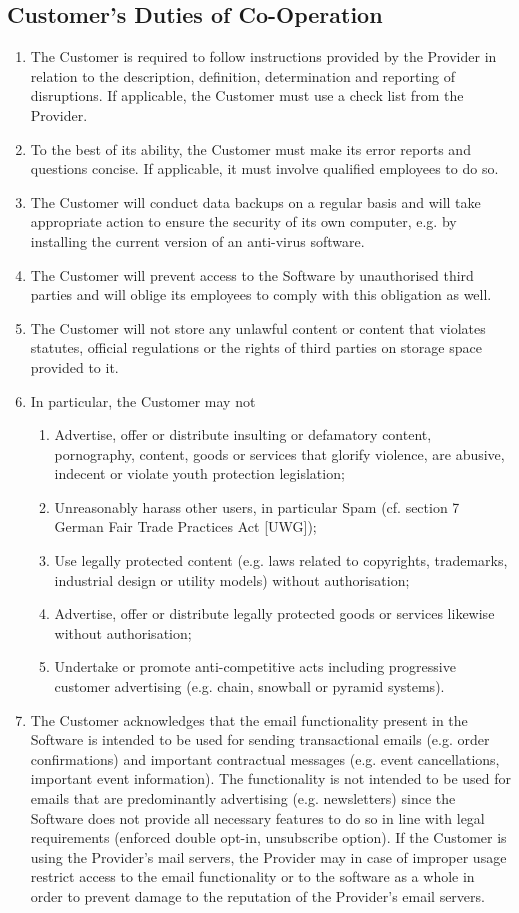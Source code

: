 \documentclass{terms}
\begin{document}
\subsection{Customer’s Duties of Co-Operation}
\begin{enumerate}
\item The Customer is required to follow instructions provided by the Provider in relation to the description, definition, determination and reporting of disruptions. If applicable, the Customer must use a check list from the Provider.
\item To the best of its ability, the Customer must make its error reports and questions concise. If applicable, it must involve qualified employees to do so.
\item The Customer will conduct data backups on a regular basis and will take appropriate action to ensure the security of its own computer, e.g. by installing the current version of an anti-virus software.
\item The Customer will prevent access to the Software by unauthorised third parties and will oblige its employees to comply with this obligation as well.
\item The Customer will not store any unlawful content or content that violates statutes, official regulations or the rights of third parties on storage space provided to it. 
\item In particular, the Customer may not \begin{enumerate}
\item Advertise, offer or distribute insulting or defamatory content, pornography, content, goods or services that glorify violence, are abusive, indecent or violate youth protection legislation;
\item Unreasonably harass other users, in particular Spam (cf. section 7 German Fair Trade Practices Act [UWG]);
\item Use legally protected content (e.g. laws related to copyrights, trademarks, industrial design or utility models) without authorisation;
\item Advertise, offer or distribute legally protected goods or services likewise without authorisation;
\item Undertake or promote anti-competitive acts including progressive customer advertising (e.g. chain, snowball or pyramid systems).
\end{enumerate}
\item The Customer acknowledges that the email functionality present in the Software is intended to be used for sending transactional emails (e.g. order confirmations) and important contractual messages (e.g. event cancellations, important event information). The functionality is not intended to be used for emails that are predominantly advertising (e.g. newsletters) since the Software does not provide all necessary features to do so in line with legal requirements (enforced double opt-in, unsubscribe option). If the Customer is using the Provider's mail servers, the Provider may in case of improper usage restrict access to the email functionality or to the software as a whole in order to prevent damage to the reputation of the Provider's email servers.

\end{enumerate}
\end{document}
